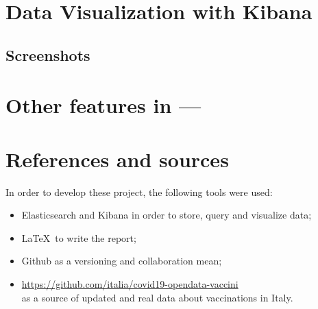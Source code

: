 \documentclass[12pt, a4paper]{article}
\begin{document}
\clearpage

\section{Data Visualization with Kibana}

\blindtext

\subsection{Screenshots}

\blindtext

\clearpage

\section{Other features in ---} 

\blindtext

\clearpage

\section{References and sources}

In order to develop these project, the following tools were used:

\begin{itemize}
    \item Elasticsearch and Kibana in order to store, query and visualize data;
    \item \LaTeX~to write the report;
    \item Github as a versioning and collaboration mean;
    \item \url{https://github.com/italia/covid19-opendata-vaccini} \\
        as a source of updated and real data about vaccinations in Italy.
\end{itemize}

\clearpage
\end{document}
